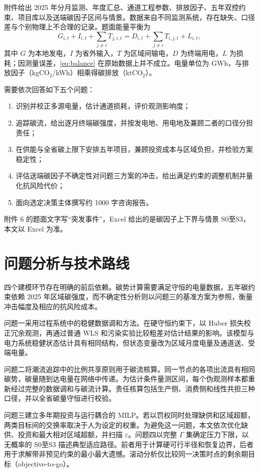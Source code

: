 \documentclass[UTF8,a4paper,zihao=-4,fontset=fandol]{ctexart}
\begin{document}
附件给出 2025 年分月监测、年度汇总、通道工程参数、排放因子、五年双控约束、项目库以及送端碳因子区间与情景。数据来自不同监测系统，存在缺失、口径差与个别物理上不合理的记录。题面能量平衡为
\begin{equation}
G_{i,t}+I_{i,t}+\sum_{j\neq i}T_{j,i,t}
=D_{i,t}+\sum_{j\neq i}T_{i,j,t}+L_{i,t},
\label{eq:balance}
\end{equation}
其中 $G$ 为本地发电，$I$ 为省外输入，$T$ 为区域间输电，$D$ 为终端用电，$L$ 为损耗；因测量误差，\eqref{eq:balance} 在原始数据上并不成立。电量单位为 GWh，与排放因子（kgCO$_2$/kWh）相乘得碳排放（ktCO$_2$）。

需要依次回答如下五个问题：
\begin{enumerate}[leftmargin=2.2em,label=（\arabic*）]
\item 识别并校正多源电量，估计通道损耗，评价观测影响度；
\item 追踪碳流，给出逐月终端碳强度，并按发电地、用电地及兼顾二者的口径分担责任；
\item 在供能与全省碳上限下安排五年项目，兼顾投资成本与区域负担，并检验方案稳定性；
\item 评估送端碳因子不确定性对问题三方案的冲击，给出满足约束的调整机制并量化抗风险代价；
\item 面向选定决策主体撰写约 1000 字咨询报告。
\end{enumerate}
附件 6 的题面文字写“突发事件”，Excel 给出的是碳因子上下界与情景 S0至S3，本文以 Excel 为准。

\section{问题分析与技术路线}

四个建模环节存在明确的前后依赖。碳势计算需要满足守恒的电量数据，五年碳约束依赖 2025 年区域碳强度，而不确定性分析则以问题三的基准方案为参照，衡量冲击幅度及相应的抗风险成本。

问题一采用过程系统中的稳健数据调和方法。在硬守恒约束下，以 Huber 损失校正冗余观测，再通过普通 WLS 和污染实验比较粗差对估计结果的影响。该模型与电力系统稳健状态估计具有相同结构，但状态变量改为区域月度电量及通道送、受端电量。

问题二将潮流追踪中的比例共享原则用于碳流核算。同一节点的各项出流具有相同碳势，碳量随到达电量在网络中传递。为估计条件量测区间，每个伪观测样本都重新经过完整的数据调和与碳流计算。责任核算包括生产侧、消费侧和线性共担三种口径，并以全省碳量守恒进行校验。

问题三建立多年期投资与运行耦合的 MILP。若以罚权同时处理缺供和区域超额，两类目标间的交换率取决于人为设定的权重。为避免这一问题，本文依次优化缺供、投资和最大相对区域超额，并扫描 $\varepsilon$。问题四以完整 $\Gamma$ 集确定压力下限，以无概率的 S0至S3 描述典型适应路径。前者用于计算硬可行半径和恢复边界，后者用于求解带非预见约束的最小最大遗憾。滚动分析仅比较同一决策时点的剩余期目标（objective-to-go）。
\end{document}
